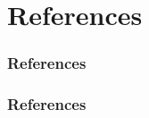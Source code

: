 \documentclass{beamer}
\begin{document}




















\section{References}


\begin{frame}[allowframebreaks]
\frametitle{References}


\frametitle{References}

\end{frame}
\end{document}
